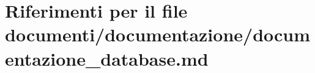 \hypertarget{documentazione_2documentazione__database_8md}{}\section{Riferimenti per il file documenti/documentazione/documentazione\+\_\+database.md}
\label{documentazione_2documentazione__database_8md}
